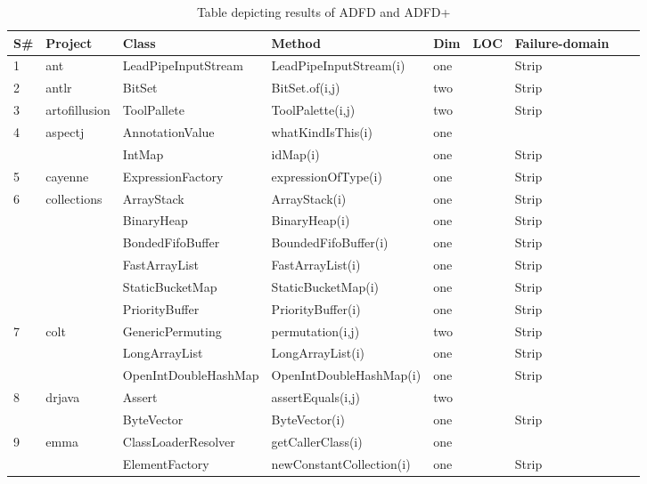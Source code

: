\documentclass[runningheads,a4paper]{llncs}
\begin{document}
\begin{table}[h]
\caption{Table depicting results of ADFD and ADFD+}
\centering
{\renewcommand{\arraystretch}{.7}
\begin{tabular}{|l|l|l|l|l|l|l|l|l|}
\hline

S\# 	& 	Project 		& Class					& Method 				& Dim   		& LOC 	& Failure-domain 	\\
\hline
1	&	ant			& LeadPipeInputStream	& LeadPipeInputStream(i) 	& one		&  		& Strip     	\\ 
2	&	antlr		& BitSet					& BitSet.of(i,j)			& two		& 		& Strip 	 	\\
3	&	artofillusion	& ToolPallete			  	& ToolPalette(i,j)			& two		& 		& Strip		\\ 
4	&	aspectj		& AnnotationValue	  	& whatKindIsThis(i)		& one		& 		& 		\\ 
	&				& IntMap			  	& idMap(i)				& one		& 		& Strip\\ 
5	&	cayenne		& ExpressionFactory	  	& expressionOfType(i)	& one		& 		& Strip\\ 
6	&	collections	& ArrayStack				& ArrayStack(i)			& one		& 		& Strip  										\\ 
	&				& BinaryHeap			& BinaryHeap(i)			& one		& 		& Strip  										\\
	&				& BondedFifoBuffer		& BoundedFifoBuffer(i)	& one		& 		& Strip  										\\
	&				& FastArrayList			& FastArrayList(i)			& one		& 		& Strip  										\\ 
	&				& StaticBucketMap		& StaticBucketMap(i)		& one		& 		& Strip  										\\ 
	&				& PriorityBuffer			& PriorityBuffer(i)			& one		& 		& Strip  										\\ 
7	&	colt			& GenericPermuting		& permutation(i,j)		& two		& 		& Strip  										\\ 
	&				& LongArrayList			& LongArrayList(i)		& one		& 		& Strip  										\\ 
	&				& OpenIntDoubleHashMap& OpenIntDoubleHashMap(i) & one		& 		& Strip  										\\ 
8	&	drjava		& Assert					& assertEquals(i,j)		& two		& 		&						\\ 
	&				& ByteVector				& ByteVector(i)			& one		& 		& Strip  										\\ 			
9	&	emma		& ClassLoaderResolver	& getCallerClass(i)		& one		& 		&								\\ 
	&				& ElementFactory			& newConstantCollection(i)& one		& 		& Strip  											 \\ 

\end{tabular}}
\end{table}
\end{document}
